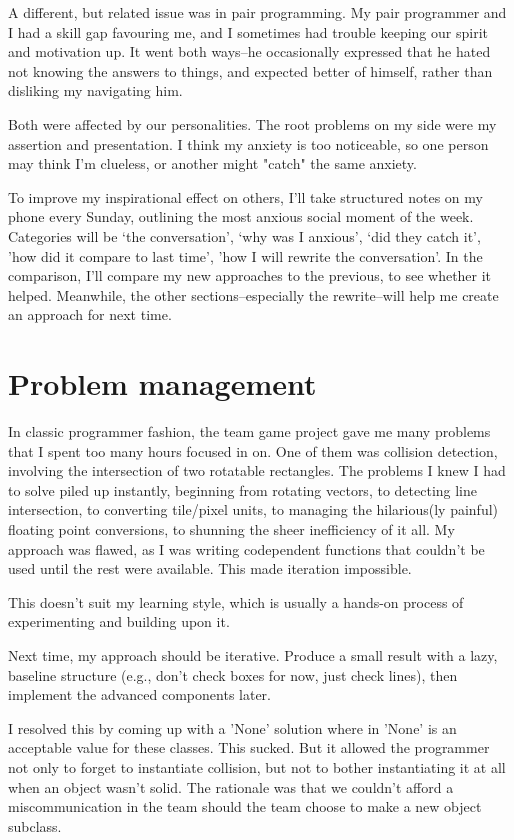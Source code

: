 \documentclass{scrartcl}
\begin{document}
A different, but related issue was in pair programming. My pair programmer and I had a skill gap favouring me, and I sometimes had trouble keeping our spirit and motivation up. It went both ways--he occasionally expressed that he hated not knowing the answers to things, and expected better of himself, rather than disliking my navigating him.

Both were affected by our personalities. The root problems on my side were my assertion and presentation. I think my anxiety is too noticeable, so one person may think I'm clueless, or another might "catch" the same anxiety.

To improve my inspirational effect on others, I'll take structured notes on my phone every Sunday, outlining the most anxious social moment of the week. Categories will be `the conversation', `why was I anxious', `did they catch it', 'how did it compare to last time', 'how I will rewrite the conversation'. In the comparison, I'll compare my new approaches to the previous, to see whether it helped. Meanwhile, the other sections--especially the rewrite--will help me create an approach for next time.

\section{Problem management}

In classic programmer fashion, the team game project gave me many problems that I spent too many hours focused in on. One of them was collision detection, involving the intersection of two rotatable rectangles. The problems I knew I had to solve piled up instantly, beginning from rotating vectors, to detecting line intersection, to converting tile/pixel units, to managing the hilarious(ly painful) floating point conversions, to shunning the sheer inefficiency of it all. My approach was flawed, as I was writing codependent functions that couldn't be used until the rest were available. This made iteration impossible.

This doesn't suit my learning style, which is usually a hands-on process of experimenting and building upon it.

Next time, my approach should be iterative. Produce a small result with a lazy, baseline structure (e.g., don't check boxes for now, just check lines), then implement the advanced components later. 

I resolved this by coming up with a 'None' solution where in 'None' is an acceptable value for these classes. This sucked. But it allowed the programmer not only to forget to instantiate collision, but not to bother instantiating it at all when an object wasn't solid. The rationale was that we couldn't afford a miscommunication in the team should the team choose to make a new object subclass.
\end{document}
